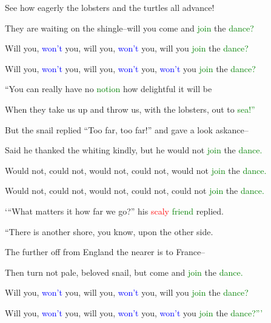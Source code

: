  See how eagerly the lobsters and the turtles all \textcolor{BurntOrange}{advance!}

 They are \textcolor{BurntOrange}{waiting} on the shingle--will you come and \textcolor{green}{join} the \textcolor{green}{dance?}



 Will you, \textcolor{blue}{won’t} you, will you, \textcolor{blue}{won’t} you, will you \textcolor{green}{join} the \textcolor{green}{dance?}

 Will you, \textcolor{blue}{won’t} you, will you, \textcolor{blue}{won’t} you, \textcolor{blue}{won’t} you \textcolor{green}{join} the \textcolor{green}{dance?}



 “You can really have no \textcolor{green}{notion} how \textcolor{BurntOrange}{delightful} it will be

 When they take us up and throw us, with the lobsters, out to \textcolor{green}{sea!”}

 But the snail replied “Too far, too far!” and gave a look askance--

 Said he thanked the \textcolor{BurntOrange}{whiting} kindly, but he would not \textcolor{green}{join} the \textcolor{green}{dance.}



 Would not, could not, would not, could not, would not \textcolor{green}{join} the \textcolor{green}{dance.}

 Would not, could not, would not, could not, could not \textcolor{green}{join} the \textcolor{green}{dance.}



 ‘“What matters it how far we go?” his \textcolor{red}{scaly} \textcolor{green}{friend} replied.

 “There is another shore, you know, upon the other side.

 The further off from England the nearer is to France--

 Then turn not pale, beloved snail, but come and \textcolor{green}{join} the \textcolor{green}{dance.}



 Will you, \textcolor{blue}{won’t} you, will you, \textcolor{blue}{won’t} you, will you \textcolor{green}{join} the \textcolor{green}{dance?}

 Will you, \textcolor{blue}{won’t} you, will you, \textcolor{blue}{won’t} you, \textcolor{blue}{won’t} you \textcolor{green}{join} the \textcolor{green}{dance?”’}



